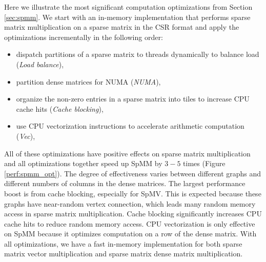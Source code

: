 Here we illustrate the most significant computation optimizations from Section
\ref{sec:spmm}. We start with an in-memory implementation that
performs sparse matrix multiplication on a sparse matrix in the CSR format
and apply the optimizations incrementally in the following order:
\begin{itemize} \itemsep1pt \parskip0pt 
	\item dispatch partitions of a sparse matrix to threads dynamically
		to balance load (\textit{Load balance}),
	\item partition dense matrices for NUMA (\textit{NUMA}),
	\item organize the non-zero entries in a sparse matrix into tiles to
		increase CPU cache hits (\textit{Cache blocking}),
	\item use CPU vectorization instructions to accelerate arithmetic
		computation (\textit{Vec}),
\end{itemize}

All of these optimizations have positive effects on sparse matrix
multiplication and all optimizations together speed up SpMM by $3-5$ times
(Figure \ref{perf:spmm_opt}). The degree of effectiveness
varies between different graphs and different numbers of columns in
the dense matrices. The largest performance boost is from cache blocking,
especially for SpMV. This is expected because these graphs have near-random
vertex connection, which leads many random memory access in sparse matrix
multiplication. Cache blocking significantly increases CPU cache hits to reduce
random memory access. CPU vectorization is only effective on SpMM because
it optimizes computation on a row of the dense matrix.
With all optimizations, we have a fast in-memory implementation for both
sparse matrix vector multiplication and sparse matrix dense matrix multiplication.

